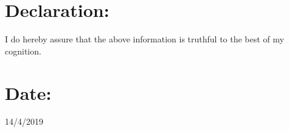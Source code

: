 \documentclass[margin,line]{res}
\begin{document}
\begin{resume}
{\section{\Large \bf{Declaration:}}} 

	I do hereby assure that the above information is truthful to the best of my cognition.
\hfill\\

{\section{\Large \bf{Date:}}}  14/4/2019



\end{resume}
\end{document}
